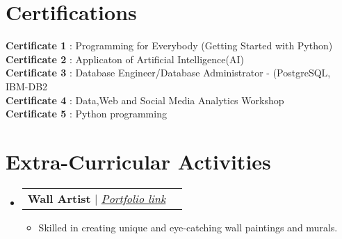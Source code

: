 \documentclass[letterpaper,11pt]{article}
\makeatletter
\newcommand{\resumeItem}[1]{
  \item\small{
    {#1 \vspace{-2pt}}
  }
}
\newcommand{\resumeProjectHeading}[2]{
    \item
    \begin{tabular*}{1.001\textwidth}{l@{\extracolsep{\fill}}r}
      \small#1 & \textbf{\small #2}\\
    \end{tabular*}\vspace{-7pt}
}
\newcommand{\resumeSubHeadingListStart}{\begin{itemize}[leftmargin=0.0in, label={}]}
\newcommand{\resumeSubHeadingListEnd}{\end{itemize}}
\newcommand{\resumeItemListStart}{\begin{itemize}}
\newcommand{\resumeItemListEnd}{\end{itemize}\vspace{-5pt}}
\makeatother
\begin{document}
\section{Certifications}
\textbf{Certificate 1} {: Programming for Everybody (Getting Started with Python)} \\
\textbf{Certificate 2} {: Applicaton of Artificial Intelligence(AI)} \\
\textbf{Certificate 3} {: Database Engineer/Database Administrator - (PostgreSQL, IBM-DB2} \\
\textbf{Certificate 4} {: Data,Web and Social Media Analytics Workshop} \\
\textbf{Certificate 5} {: Python programming}


\section{Extra-Curricular Activities}
\vspace{-6pt}
    \resumeSubHeadingListStart
    \resumeProjectHeading
    {\textbf{Wall Artist} $|$ \emph{\href{https://gamma.app/docs/Wall-Artist-Portfolio-khep02ftv69voxh}{Portfolio link}}}{}
    \resumeItemListStart
            \resumeItem{Skilled in creating unique and eye-catching wall paintings and murals.}
          \resumeItemListEnd
    \resumeSubHeadingListEnd
\vspace{-16pt}
\end{document}
